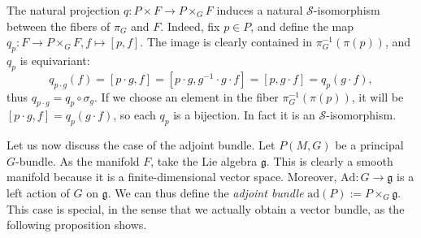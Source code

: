 \begin{obs}\label{def_q_p}
    The natural projection \(q\colon P \times F \to P \times_G F\) induces a natural \(\mathcal{S}\)-isomorphism between the fibers of \(\pi_G\) and \(F\). Indeed, fix \(p \in P\), and define the map \(q_p\colon F \to P \times_GF, f \mapsto [p,f]\). The image is clearly contained in \(\pi_G^{-1}(\pi(p))\), and \(q_p\) is equivariant:
    \[
    q_{p\cdot g}(f)=[p\cdot g, f]=[p \cdot g, g^{-1}\cdot g \cdot f]=[p, g \cdot f]=q_p(g \cdot f),
    \]
    thus \(q_{p \cdot g}=q_p \circ \sigma_g\). If we choose an element in the fiber \(\pi_G^{-1}(\pi(p))\), it will be \([p \cdot g, f]=q_{p}(g\cdot f)\), so each \(q_p\) is a bijection. In fact it is an \(\mathcal{S}\)-isomorphism.
\end{obs}


Let us now discuss the case of the adjoint bundle. Let \(P(M,G)\) be a principal \(G\)-bundle. As the manifold \(F\), take the Lie algebra \(\mathfrak{g}\). This is clearly a smooth manifold because it is a finite-dimensional vector space. Moreover, \(\mathrm{Ad}\colon G \to \mathfrak{g}\) is a left action of \(G\) on \(\mathfrak{g}\). We can thus define the \textit{adjoint bundle} \(\mathrm{ad}(P):=P \times_G \mathfrak{g}\). This case is special, in the sense that we actually obtain a vector bundle, as the following proposition shows.

